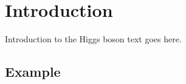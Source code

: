 \chapter{Introduction}\label{chapter:introduction}

Introduction to the Higgs boson text goes here.

\section{Example}\label{sec:example}
